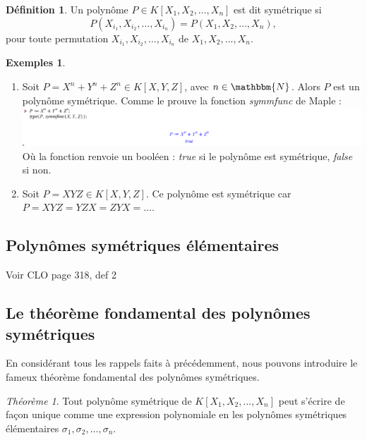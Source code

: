 \documentclass[12pt]{article}
\theoremstyle{remark}\newtheorem{note}{Note}
\theoremstyle{remark}\newtheorem{nota}{Notation}
\newtheorem{theorem}{Théorème}
\theoremstyle{definition}
\newtheorem{definition}{Définition}
\newtheorem*{examples}{Exemples}
\begin{document}

\begin{definition}
Un polynôme $P \in K\left[ X_1, X_2, \ldots , X_n \right] $ est dit symétrique si $$P(X_{i_1}, X_{i_2}, \ldots , X_{i_n}) = P(X_1,X_2,\ldots ,X_n),$$ pour toute permutation $X_{i_1}, X_{i_2}, \ldots , X_{i_n}$ de $X_1,X_2, \ldots ,X_n$.
\end{definition}
\vspace{12pt}
\begin{examples}
\begin{enumerate}
	\item Soit $P = X^{n} + Y^{n} + Z^{n}\in K\left[ X,Y,Z\right]$, avec $n \in \mathbbm{N}$. Alors $P$ est un polynôme symétrique. Comme le prouve la fonction \textsl{symmfunc} de Maple :\\ 
	
	\includegraphics[scale=0.8]{1.png}
Où la fonction renvoie un booléen : \textsl{true} si le polynôme est symétrique, \textsl{false} si non.
	\item Soit $P = XYZ \in K\left[ X,Y,Z\right]$. Ce polynôme est symétrique car $P = XYZ = YZX = ZYX = \ldots$.
\end{enumerate}

\end{examples}

\subsection{Polynômes symétriques élémentaires}

Voir CLO page 318, def 2

\subsection{Le théorème fondamental des polynômes symétriques}
En considérant tous les rappels faits à précédemment, nous pouvons introduire le fameux théorème fondamental des polynômes symétriques.

\begin{theorem}
Tout polynôme symétrique de $K\left[ X_1, X_2, ... , X_n \right]$ peut s'écrire de façon unique comme une expression polynomiale en les polynômes symétriques élémentaires $\sigma_1, \sigma_2,..., \sigma_n$.
\end{theorem}
\end{document}

